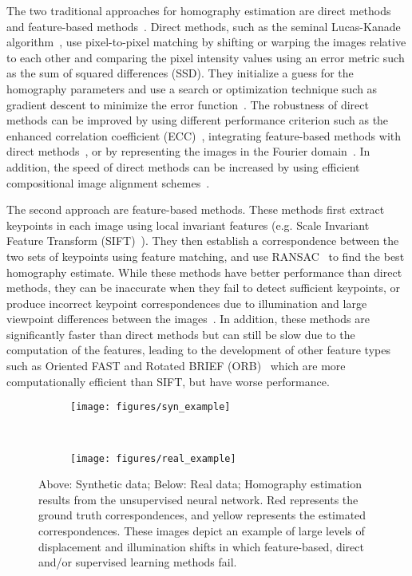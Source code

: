 \documentclass[letterpaper, 10 pt, conference]{ieeeconf}
\begin{document}
The two traditional approaches for homography estimation are direct methods and feature-based methods~\cite{szeliski2006image}. Direct methods, such as the seminal Lucas-Kanade algorithm~\cite{Lucas:1981:IIR:1623264.1623280}, use pixel-to-pixel matching by shifting or warping the images relative to each other and comparing the pixel intensity values using an error metric such as the sum of squared differences (SSD). They initialize a guess for the homography parameters and use a search or optimization technique such as gradient descent to minimize the error function~\cite{baker2004lucas}. The robustness of direct methods can be improved by using different performance criterion such as the enhanced correlation coefficient (ECC)~\cite{evangelidis2008parametric}, integrating feature-based methods with direct methods~\cite{yan2014heask}, or by representing the images in the Fourier domain~\cite{lucey2013fourier}. In addition, the speed of direct methods can be increased by using efficient compositional image alignment schemes~\cite{munoz2015rationalizing}.

The second approach are feature-based methods. These methods first extract keypoints in each image using local invariant features (e.g. Scale Invariant Feature Transform (SIFT)~\cite{lowe2004distinctive}). They then establish a correspondence between the two sets of keypoints using feature matching, and use RANSAC~\cite{Fischler:1981:RSC:358669.358692} to find the best homography estimate. While these methods have better performance than direct methods, they can be inaccurate when they fail to detect sufficient keypoints, or produce incorrect keypoint correspondences due to illumination and large viewpoint differences between the images~\cite{wu2007improved}. In addition, these methods are significantly faster than direct methods but can still be slow due to the computation of the features, leading to the development of other feature types such as Oriented FAST and Rotated BRIEF (ORB)~\cite{rublee2011orb} which are more computationally efficient than SIFT, but have worse performance. 


\begin{figure}[t]
  \centering
\begin{subfigure}{.9\linewidth}
  \centering
\texttt{[image: figures/syn\_example]}
\end{subfigure}  \\
    
\begin{subfigure}{.9\linewidth}
	\centering
\texttt{[image: figures/real\_example]}
\end{subfigure}   
\caption{Above: Synthetic data; Below: Real data; Homography estimation results from the unsupervised neural network. Red represents the ground truth correspondences, and yellow represents the estimated correspondences. These images depict an example of large levels of displacement and illumination shifts in which feature-based, direct and/or supervised learning methods fail.}
\label{fig:unsupervised_example}
\vspace{-2mm}
\end{figure}
\end{document}
